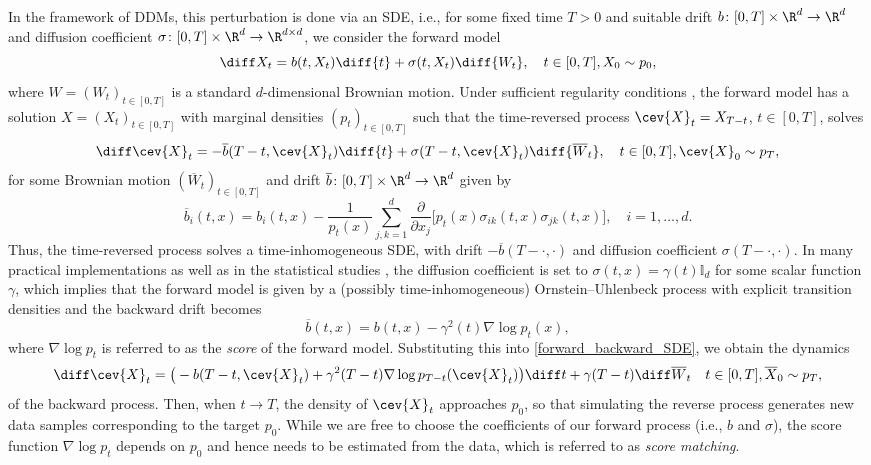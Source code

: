\documentclass[a4paper, 11pt, headings = small, abstract]{scrartcl}
\begin{document}
In the framework of DDMs, this perturbation is done via an SDE, i.e., for some fixed time $T>0$ and suitable drift $b\colon[0, T]\times\R^d\to\R^d$ and diffusion coefficient $\sigma\colon[0, T]\times\R^d\to\R^{d\times d}$, we consider the forward model
\[
	\diff X_t
	=b(t, X_t)\diff{t}+\sigma(t, X_t)\diff{W_t},\quad t\in[0, T], X_0\sim p_0,
\]
where $W=(W_t)_{t\in[0, T]}$ is a standard $d$-dimensional Brownian motion.
Under sufficient regularity conditions \cite{anderson82,haussmann86}, the forward model has a solution $X=(X_t)_{t\in[0, T]}$ with marginal densities $(p_t)_{t \in [0,T]}$ such that the time-reversed process $\cev{X}_t = X_{T-t}$, $t \in [0,T]$, solves
\begin{equation}
	\label{forward_backward_SDE}
	\diff\cev{X}_t
	=-\overline{b}(T-t, \cev{X}_t)\diff{t}+\sigma(T-t, \cev{X}_t)\diff{\overline{W}_t},\quad t\in[0, T], \cev{X}_0\sim p_T,
\end{equation}
for some Brownian motion $(\overline{W}_t)_{t \in [0,T]}$ and drift $\overline{b}\colon [0,T] \times \R^d \to \R^d$  given by 
\[
	\overline{b}_i(t, x)=b_i(t, x)-\frac{1}{p_t(x)}\sum_{j, k=1}^{d}\frac{\partial}{\partial x_j}\big[p_t(x)\sigma_{ik}(t, x)\sigma_{jk}(t, x)\big],\quad i=1,\ldots, d.
\]
Thus, the time-reversed process solves a  time-inhomogeneous SDE, with drift $-\overline{b}(T-\cdot,\cdot)$ and diffusion coefficient $\sigma(T-\cdot,\cdot)$. 
In many practical implementations as well as in the statistical studies \cite{oko23,chen23b,tang24,azangulov24}, the diffusion coefficient is set to $\sigma(t,x) = \gamma(t) \mathbb{I}_d$ for some scalar function $\gamma$, which implies that the forward model is given by a (possibly time-inhomogeneous) Ornstein--Uhlenbeck process with explicit transition densities and the backward drift becomes
\[
	\overline{b}(t, x)
	=b(t, x)-\gamma^2(t)\nabla\log p_t(x),
\]
where $\nabla \log p_t$ is referred to as the \textit{score} of the forward model. 
Substituting this into \eqref{forward_backward_SDE}, we obtain the dynamics
\[
	\diff\cev{X}_t
	=\big(-b(T-t, \cev{X}_t)+\gamma^2(T-t)\nabla\log p_{T-t}(\cev{X}_t)\big)\diff t+\gamma(T-t)\diff \overline{W}_t\quad t\in[0, T], \overline{X}_0\sim p_T,
\]
of the backward process. Then, when $t\rightarrow T$, the density of $\cev{X}_t$ approaches $p_0$, so that simulating the reverse process generates new data samples corresponding to the target $p_0$. 
While we are free to choose the coefficients of our forward process (i.e., $b$ and $\sigma$), the score function $\nabla \log p_t$ depends on $p_0$ and hence needs to be estimated from the data, which is referred to as \emph{score matching}.
\end{document}
